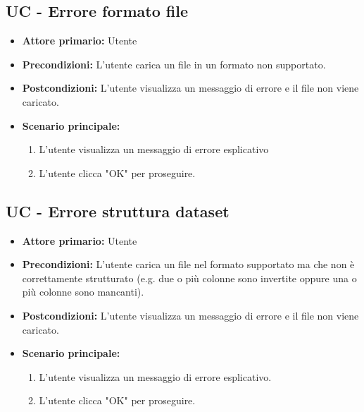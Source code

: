 
\subsection{UC - Errore formato file}
\label{sec:UC - Errore formato file}
\begin{itemize}
    \item \textbf{Attore primario:} Utente
    \item \textbf{Precondizioni:} L'utente carica un file in un formato non supportato.
    \item \textbf{Postcondizioni:} L'utente visualizza un messaggio di errore e il file non viene caricato.
    \item \textbf{Scenario principale:}
          \begin{enumerate}
              \item L'utente visualizza un messaggio di errore esplicativo
              \item L'utente clicca "OK" per proseguire.
          \end{enumerate}
\end{itemize}

\subsection{UC - Errore struttura dataset}
\label{sec:UC - Errore struttura dataset}
\begin{itemize}
    \item \textbf{Attore primario:} Utente
    \item \textbf{Precondizioni:} L'utente carica un file nel formato supportato ma che non è correttamente strutturato  
                                  (e.g. due o più colonne sono invertite oppure una o più colonne sono mancanti). 
    \item \textbf{Postcondizioni:} L'utente visualizza un messaggio di errore e il file non viene caricato.
    \item \textbf{Scenario principale:}
          \begin{enumerate}
              \item L'utente visualizza un messaggio di errore esplicativo.
              \item L'utente clicca "OK" per proseguire.
          \end{enumerate} 
\end{itemize}
